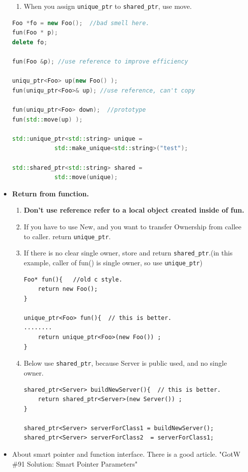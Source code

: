 \documentclass[a4paper,11pt,twoside]{book}
\begin{document}
\begin{itemize}
\begin{enumerate}
    \item When you assign \texttt{unique\_ptr} to \texttt{shared\_ptr}, use move.
\end{enumerate}

\begin{lstlisting}[frame=single, language=c++]
Foo *fo = new Foo();  //bad smell here.
fun(Foo * p);
delete fo;

fun(Foo &p); //use reference to improve efficiency

uniqu_ptr<Foo> up(new Foo() );
fun(uniqu_ptr<Foo>& up); //use reference, can't copy 

fun(uniqu_ptr<Foo> down);  //prototype
fun(std::move(up) );

std::unique_ptr<std::string> unique = 
			std::make_unique<std::string>("test");
			
std::shared_ptr<std::string> shared = 
			std::move(unique);
\end{lstlisting}


\item \textbf{Return from function.}
\begin{enumerate}

    \item \textbf{Don't  use reference refer to a local object created inside of fun.}

    \item If you have to use New, and you want to transfer Ownership from callee to caller. return \texttt{unique\_ptr}.

    \item If there is no clear single owner, store and return \texttt{shared\_ptr}.(in this example, caller of fun() is single owner, so use \texttt{unique\_ptr})

\begin{lstlisting}[numbers=none]
Foo* fun(){   //old c style.
	return new Foo();
}

unique_ptr<Foo> fun(){  // this is better.
........
	return unique_ptr<Foo>(new Foo()) ;
}
\end{lstlisting}

\item Below use \texttt{shared\_ptr}, because Server is public used, and no single owner.
\begin{lstlisting}[numbers=none]
shared_ptr<Server> buildNewServer(){  // this is better.
	return shared_ptr<Server>(new Server()) ;
}

shared_ptr<Server> serverForClass1 = buildNewServer();
shared_ptr<Server> serverForClass2  = serverForClass1;
\end{lstlisting}

\end{enumerate}

    \item About smart pointer and function interface. There is a good article. "GotW \#91 Solution: Smart Pointer Parameters"
\end{itemize}
\end{document}
